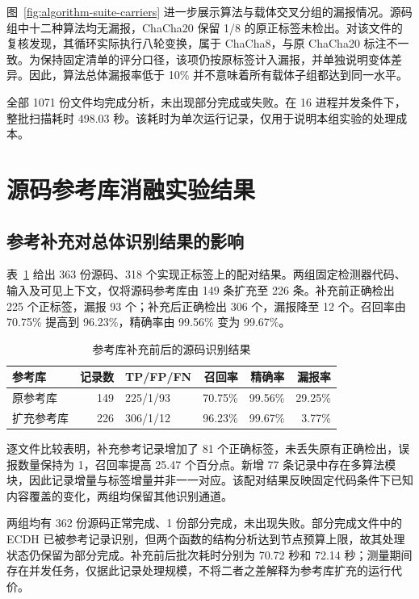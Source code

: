 图~\ref{fig:algorithm-suite-carriers} 进一步展示算法与载体交叉分组的漏报情况。源码组中十二种算法均无漏报，ChaCha20 保留 1/8 的原正标签未检出。对该文件的复核发现，其循环实际执行八轮变换，属于 ChaCha8，与原 ChaCha20 标注不一致。为保持固定清单的评分口径，该项仍按原标签计入漏报，并单独说明变体差异。因此，算法总体漏报率低于 10\% 并不意味着所有载体子组都达到同一水平。

全部 1071 份文件均完成分析，未出现部分完成或失败。在 16 进程并发条件下，整批扫描耗时 498.03 秒。该耗时为单次运行记录，仅用于说明本组实验的处理成本。

\section{源码参考库消融实验结果}
\label{sec:expanded-source-results}

\subsection{参考补充对总体识别结果的影响}

表~\ref{tab:expanded-source-ablation} 给出 363 份源码、318 个实现正标签上的配对结果。两组固定检测器代码、输入及可见上下文，仅将源码参考库由 149 条扩充至 226 条。补充前正确检出 225 个正标签，漏报 93 个；补充后正确检出 306 个，漏报降至 12 个。召回率由 70.75\% 提高到 96.23\%，精确率由 99.56\% 变为 99.67\%。

\begin{table}[H]\centering\small
\caption{参考库补充前后的源码识别结果}
\label{tab:expanded-source-ablation}
\begin{tabularx}{\linewidth}{@{}Xrlrrr@{}}\toprule
参考库 & 记录数 & TP/FP/FN & 召回率 & 精确率 & 漏报率\\\midrule
原参考库 & 149 & 225/1/93 & 70.75\% & 99.56\% & 29.25\%\\
扩充参考库 & 226 & 306/1/12 & 96.23\% & 99.67\% & 3.77\%\\\bottomrule
\end{tabularx}
\end{table}

逐文件比较表明，补充参考记录增加了 81 个正确标签，未丢失原有正确检出，误报数量保持为 1，召回率提高 25.47 个百分点。新增 77 条记录中存在多算法模块，因此记录增量与标签增量并非一一对应。该配对结果反映固定代码条件下已知内容覆盖的变化，两组均保留其他识别通道。

两组均有 362 份源码正常完成、1 份部分完成，未出现失败。部分完成文件中的 ECDH 已被参考记录识别，但两个函数的结构分析达到节点预算上限，故其处理状态仍保留为部分完成。补充前后批次耗时分别为 70.72 秒和 72.14 秒；测量期间存在并发任务，仅据此记录处理规模，不将二者之差解释为参考库扩充的运行代价。

